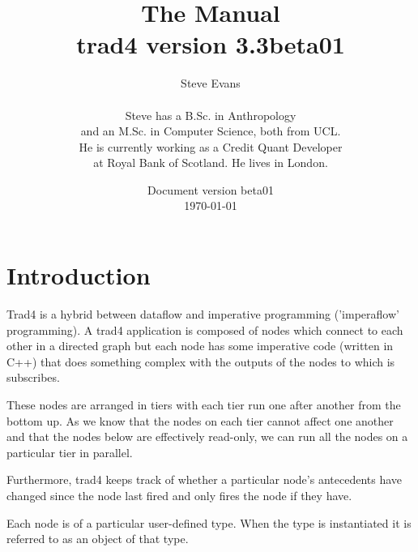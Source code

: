\documentclass{report}
\begin{document}
\title{The Manual \\
{\large \textbf{trad4 version 3.3beta01}}}

\author{Steve Evans \\\\ Steve has a B.Sc. in Anthropology \\ and an M.Sc. in Computer Science, both from UCL. \\ He is currently working as a Credit Quant Developer \\ at Royal Bank of Scotland. He lives in London.}

\date{Document version beta01 \\
\today}

\maketitle



\setcounter{tocdepth}{1}
\tableofcontents

\chapter{Introduction}

Trad4 is a hybrid between dataflow and imperative programming ('imperaflow' programming). A trad4 application is composed of nodes which connect to each other in a directed graph but each node has some imperative code (written in C++) that does something complex with the outputs of the nodes to which is subscribes.

These nodes are arranged in tiers with each tier run one after another from the bottom up. As we know that the nodes on each tier cannot affect one another and that the nodes below are effectively read-only, we can run all the nodes on a particular tier in parallel.

Furthermore, trad4 keeps track of whether a particular node's antecedents have changed since the node last fired and only fires the node if they have.

Each node is of a particular user-defined type. When the type is instantiated it is referred to as an object of that type.
\end{document}
